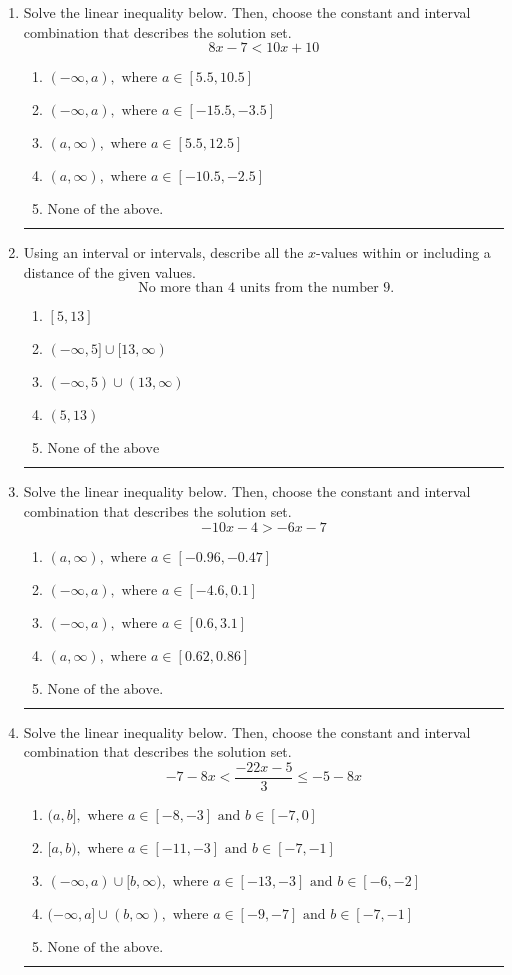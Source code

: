 \documentclass[14pt]{extbook}
\newcommand{\litem}[1]{\item#1\hspace*{-1cm}\rule{\textwidth}{0.4pt}}
\begin{document}
\begin{enumerate}
{\begin{enumerate}[label=\Alph*.]
\end{enumerate} }
\litem{
Solve the linear inequality below. Then, choose the constant and interval combination that describes the solution set.\[ 8x -7 < 10x + 10 \]\begin{enumerate}[label=\Alph*.]
\item \( (-\infty, a), \text{ where } a \in [5.5, 10.5] \)
\item \( (-\infty, a), \text{ where } a \in [-15.5, -3.5] \)
\item \( (a, \infty), \text{ where } a \in [5.5, 12.5] \)
\item \( (a, \infty), \text{ where } a \in [-10.5, -2.5] \)
\item \( \text{None of the above}. \)

\end{enumerate} }
\litem{
Using an interval or intervals, describe all the $x$-values within or including a distance of the given values.\[ \text{ No more than } 4 \text{ units from the number } 9. \]\begin{enumerate}[label=\Alph*.]
\item \( [5, 13] \)
\item \( (-\infty, 5] \cup [13, \infty) \)
\item \( (-\infty, 5) \cup (13, \infty) \)
\item \( (5, 13) \)
\item \( \text{None of the above} \)

\end{enumerate} }
\litem{
Solve the linear inequality below. Then, choose the constant and interval combination that describes the solution set.\[ -10x -4 > -6x -7 \]\begin{enumerate}[label=\Alph*.]
\item \( (a, \infty), \text{ where } a \in [-0.96, -0.47] \)
\item \( (-\infty, a), \text{ where } a \in [-4.6, 0.1] \)
\item \( (-\infty, a), \text{ where } a \in [0.6, 3.1] \)
\item \( (a, \infty), \text{ where } a \in [0.62, 0.86] \)
\item \( \text{None of the above}. \)

\end{enumerate} }
\litem{
Solve the linear inequality below. Then, choose the constant and interval combination that describes the solution set.\[ -7 - 8 x < \frac{-22 x - 5}{3} \leq -5 - 8 x \]\begin{enumerate}[label=\Alph*.]
\item \( (a, b], \text{ where } a \in [-8, -3] \text{ and } b \in [-7, 0] \)
\item \( [a, b), \text{ where } a \in [-11, -3] \text{ and } b \in [-7, -1] \)
\item \( (-\infty, a) \cup [b, \infty), \text{ where } a \in [-13, -3] \text{ and } b \in [-6, -2] \)
\item \( (-\infty, a] \cup (b, \infty), \text{ where } a \in [-9, -7] \text{ and } b \in [-7, -1] \)
\item \( \text{None of the above.} \)


\end{enumerate}}
\end{enumerate}
\end{document}
